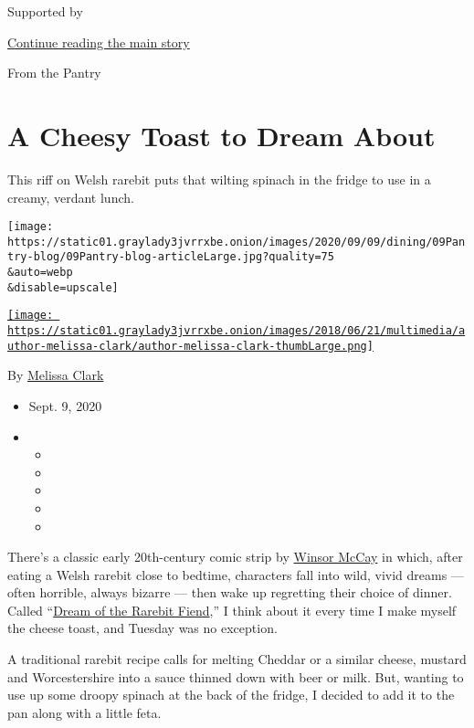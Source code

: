 Supported by

\protect\hyperlink{after-sponsor}{Continue reading the main story}

From the Pantry

\hypertarget{a-cheesy-toast-to-dream-about}{%
\section{A Cheesy Toast to Dream
About}\label{a-cheesy-toast-to-dream-about}}

This riff on Welsh rarebit puts that wilting spinach in the fridge to
use in a creamy, verdant lunch.

\texttt{[image: https://static01.graylady3jvrrxbe.onion/images/2020/09/09/dining/09Pantry-blog/09Pantry-blog-articleLarge.jpg?quality=75\\\&auto=webp\\\&disable=upscale]}

\href{https://www.nytimes3xbfgragh.onion/by/melissa-clark}{\texttt{[image: https://static01.graylady3jvrrxbe.onion/images/2018/06/21/multimedia/author-melissa-clark/author-melissa-clark-thumbLarge.png]}}

By \href{https://www.nytimes3xbfgragh.onion/by/melissa-clark}{Melissa
Clark}

\begin{itemize}
\item
  Sept. 9, 2020
\item
  \begin{itemize}
  \item
  \item
  \item
  \item
  \item
  \end{itemize}
\end{itemize}

There's a classic early 20th-century comic strip by
\href{https://www.nytimes3xbfgragh.onion/1987/06/09/books/books-of-the-times-568587.html}{Winsor
McCay} in which, after eating a Welsh rarebit close to bedtime,
characters fall into wild, vivid dreams --- often horrible, always
bizarre --- then wake up regretting their choice of dinner. Called
``\href{http://www.comicstriplibrary.org/browse/results?author=2}{Dream
of the Rarebit Fiend},'' I think about it every time I make myself the
cheese toast, and Tuesday was no exception.

A traditional rarebit recipe calls for melting Cheddar or a similar
cheese, mustard and Worcestershire into a sauce thinned down with beer
or milk. But, wanting to use up some droopy spinach at the back of the
fridge, I decided to add it to the pan along with a little feta.

